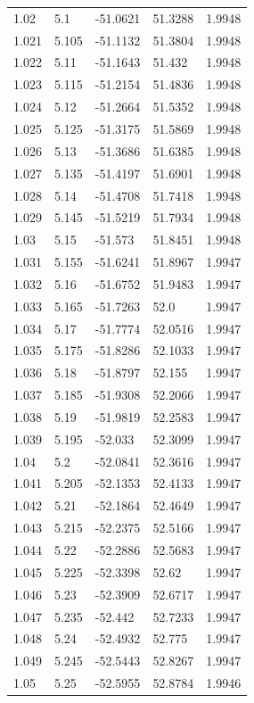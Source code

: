 \begin{tabular}{lllll}
1.02 & 5.1 & -51.0621 & 51.3288 & 1.9948 \\
1.021 & 5.105 & -51.1132 & 51.3804 & 1.9948 \\
1.022 & 5.11 & -51.1643 & 51.432 & 1.9948 \\
1.023 & 5.115 & -51.2154 & 51.4836 & 1.9948 \\
1.024 & 5.12 & -51.2664 & 51.5352 & 1.9948 \\
1.025 & 5.125 & -51.3175 & 51.5869 & 1.9948 \\
1.026 & 5.13 & -51.3686 & 51.6385 & 1.9948 \\
1.027 & 5.135 & -51.4197 & 51.6901 & 1.9948 \\
1.028 & 5.14 & -51.4708 & 51.7418 & 1.9948 \\
1.029 & 5.145 & -51.5219 & 51.7934 & 1.9948 \\
1.03 & 5.15 & -51.573 & 51.8451 & 1.9948 \\
1.031 & 5.155 & -51.6241 & 51.8967 & 1.9947 \\
1.032 & 5.16 & -51.6752 & 51.9483 & 1.9947 \\
1.033 & 5.165 & -51.7263 & 52.0 & 1.9947 \\
1.034 & 5.17 & -51.7774 & 52.0516 & 1.9947 \\
1.035 & 5.175 & -51.8286 & 52.1033 & 1.9947 \\
1.036 & 5.18 & -51.8797 & 52.155 & 1.9947 \\
1.037 & 5.185 & -51.9308 & 52.2066 & 1.9947 \\
1.038 & 5.19 & -51.9819 & 52.2583 & 1.9947 \\
1.039 & 5.195 & -52.033 & 52.3099 & 1.9947 \\
1.04 & 5.2 & -52.0841 & 52.3616 & 1.9947 \\
1.041 & 5.205 & -52.1353 & 52.4133 & 1.9947 \\
1.042 & 5.21 & -52.1864 & 52.4649 & 1.9947 \\
1.043 & 5.215 & -52.2375 & 52.5166 & 1.9947 \\
1.044 & 5.22 & -52.2886 & 52.5683 & 1.9947 \\
1.045 & 5.225 & -52.3398 & 52.62 & 1.9947 \\
1.046 & 5.23 & -52.3909 & 52.6717 & 1.9947 \\
1.047 & 5.235 & -52.442 & 52.7233 & 1.9947 \\
1.048 & 5.24 & -52.4932 & 52.775 & 1.9947 \\
1.049 & 5.245 & -52.5443 & 52.8267 & 1.9947 \\
1.05 & 5.25 & -52.5955 & 52.8784 & 1.9946 \\

\end{tabular}
